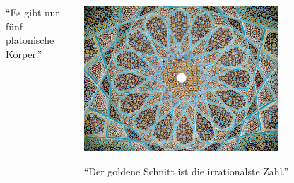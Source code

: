 \documentclass[12pt,compress,ngerman,utf8,t]{beamer}
\begin{document}
\begin{frame}
\begin{columns}[t]
\begin{column}{0.32\textwidth}
      "`Es gibt nur fünf platonische Körper."'
    \end{column}
    \begin{column}{0.37\textwidth}
      \centering\includegraphics[width=0.7\textwidth]{hafez-tomb}
      \medskip

      "`Der goldene Schnitt ist die irrationalste Zahl."'
    \end{column}
  \end{columns}
\end{frame}
\end{document}

